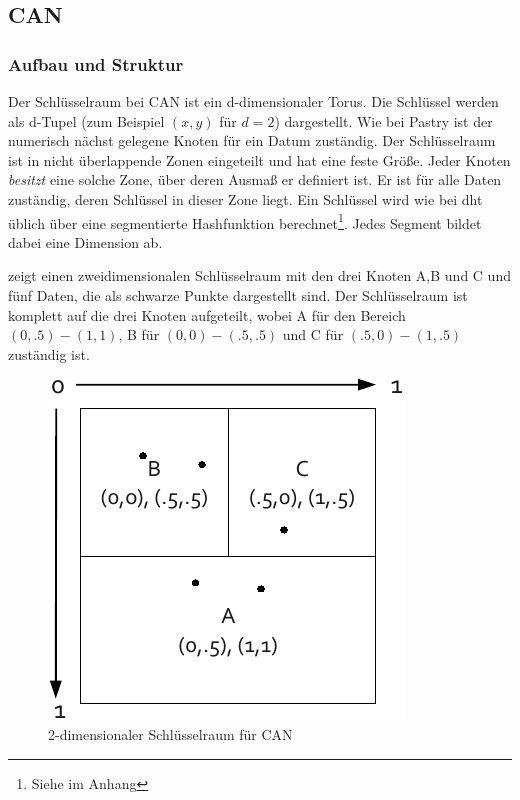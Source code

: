 \subsection{CAN}
\label{chap:evaluation_can}

\subsubsection{Aufbau und Struktur}
Der Schlüsselraum bei CAN \cite{Ratnasamy2001Scalable} ist ein d-dimensionaler Torus. Die Schlüssel werden als d-Tupel (zum Beispiel $(x,y)$ für $d=2$) dargestellt. Wie bei Pastry ist der numerisch nächst gelegene Knoten für ein Datum zuständig. Der Schlüsselraum ist in nicht überlappende Zonen eingeteilt und hat eine feste Größe. Jeder Knoten \emph{besitzt} eine solche Zone, über deren Ausmaß er definiert ist. Er ist für alle Daten zuständig, deren Schlüssel in dieser Zone liegt. Ein Schlüssel wird wie bei \ac{dht} üblich über eine segmentierte Hashfunktion berechnet\footnote{Siehe  im Anhang}. Jedes Segment bildet dabei eine Dimension ab.

 zeigt einen zweidimensionalen Schlüsselraum mit den drei Knoten A,B und C und fünf Daten, die als schwarze Punkte dargestellt sind. Der Schlüsselraum ist komplett auf die drei Knoten aufgeteilt, wobei A für den Bereich $(0, .5)-(1, 1)$, B für $(0, 0)-(.5, .5)$ und C für $(.5, 0)-(1, .5)$ zuständig ist.

\begin{figure}[htbp]
\centering
\includegraphics{grafics/can_key_space.pdf}
\caption{2-dimensionaler Schlüsselraum für CAN}
\label{fig:can_key_space}
\end{figure}

